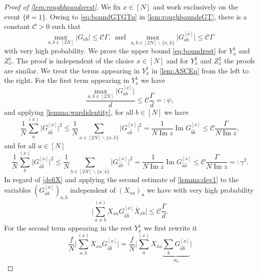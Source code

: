 \documentclass[11pt]{article}
\DeclareMathOperator{\Ima}{Im}
\newcommand{\abs}[1]{\left| #1 \right|}
\newcommand{\absb}[1]{\bigl| #1 \bigr|}
\newcommand{\absbb}[1]{\biggl| #1 \biggr|}
\theoremstyle{plain}
\theoremstyle{remark}
\numberwithin{equation}{section}
\newcommand*\barr[1]{\overline{#1}}
\newcommand*\bset[1]{[#1]}
\newcommand*\ubarr[1]{{\widehat{#1}}}
\begin{document}
	
\begin{proof}[Proof of \cref{lem:roughboundsrest}]
		We fix $x \in [N]$ and work exclusively on the event $\{\theta=1\}$. Owing to  \cref{eq:boundGTGTu} in \cref{lem:roughboundsGT}, there is a constant $\mathcal{C}>0$ such that 
		\begin{equation*}
			\max_{a,b \in [2N]} \abs{G_{ab}} \le \mathcal{C} \Gamma,~~\text{and}~~\max_{a,b \in [2N]\backslash\{x,\ubarr{x}\}} \absb{G_{ab}^{\bset{x}}} \le \mathcal{C} \Gamma
		\end{equation*}
		with very high probability. 
		We prove the upper bound \cref{eq:boundrest} for $Y^{1}_{x}$ and $Z^{1}_x$. The proof is independent of the choice $x \in [N]$ and for $Y^2_x$ and $Z^{2}_x$ the proofs are similar. We treat the terms appearing in $Y_{x}^1$ in \cref{lem:ASCEq} from the left to the right. For the first term appearing in $Y_{x}^1$ we have
		\begin{equation*}
			\frac{\max_{a,b \in [2N]} \absb{G^{\bset{x}}_{ab}}}{d} \le\mathcal{C} \frac{\Gamma}{d}   =: \psi,
		\end{equation*}
		and applying \cref{lemma:wardidentity}, for all $b\in [N]$ we have
		\begin{equation*}
			\frac{1}{N}\sum_{a}^{(x)}\absb{G_{\ubarr{a}\ubarr{b}}^{\bset{x}}}^2\le \frac{1}{N}\sum_{a \in [2N] \backslash\{x,\ubarr{x}\}}\absb{G_{a\ubarr{b}}^{\bset{x}}}^2= \frac{1}{N\Ima z} \Ima G_{\ubarr{b}\ubarr{b}}^{\bset{x}} \le  \mathcal{C}\frac{\Gamma}{N\Ima z} ,
		\end{equation*}
		and for all $a \in [N]$
		\begin{equation*}
			\frac{1}{N}\sum_{b}^{(x)}\absb{G_{\ubarr{a}\ubarr{b}}^{\bset{x}}}^2\le \frac{1}{N}\sum_{b \in [2N] \backslash\{x,\ubarr{x}\}}\absb{G_{\ubarr{a}b}^{\bset{x}}}^2= \frac{1}{N\Ima z} \Ima G_{\ubarr{a}\ubarr{a}}^{\bset{x}}  \le  \mathcal{C}\frac{\Gamma}{N\Ima z} =: \gamma^2.
		\end{equation*}
		In regard of \cref{defiX} and applying the second estimate of \cref{lemma:dev1} to the variables $(G_{ab}^{\bset{x}})_{a,b}$ independent of $(X_{xa})_{a}$ we have with very high probability 
		\begin{equation}
			\absbb{ \sum_{a\neq b}^{(x)} X_{xa} G_{\ubarr{a}\ubarr{b}}^{\bset{x}} \barr{X}_{xb} } \le \mathcal{C} \frac{\Gamma}{d}.
		\end{equation}
		For the second term appearing in the rest $Y^{1}_x$ we first rewrite it
		\begin{equation*}
			\frac{f}{N} \absbb{ \sum_{a,b}^{(x)} X_{xa} G^{\bset{x}}_{\ubarr{a}\ubarr{b}}} = \frac{f}{N}\absbb{ \sum_{a}^{(x)} X_{xa} \underbrace{\sum_{b}  G^{\bset{x}}_{\ubarr{a}\ubarr{b}}}_{\alpha_a}}

\end{equation*}
\end{proof}
\end{document}
